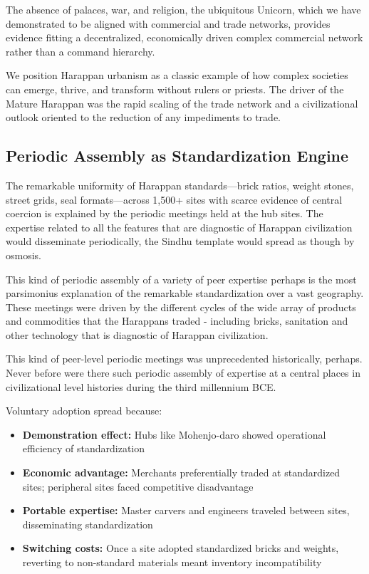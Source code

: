 \documentclass[12pt]{article}
\begin{document}
The absence of palaces, war, and religion, the ubiquitous Unicorn, which
we have demonstrated to be aligned with commercial and trade networks, provides
evidence fitting a decentralized, economically driven complex commercial network
rather than a command hierarchy.

We position Harappan urbanism as a classic example of how complex societies can emerge,
thrive, and transform without rulers or priests. The driver of the Mature Harappan
was the rapid scaling of the trade network and a civilizational outlook oriented to
the reduction of any impediments to trade.

\subsection{Periodic Assembly as Standardization Engine}

The remarkable uniformity of Harappan standards---brick ratios, weight stones, street
grids, seal formats---across 1,500+ sites with scarce evidence of central coercion is
explained by the periodic meetings held at the hub sites. The expertise related to
all the features that are diagnostic of Harappan civilization would disseminate
periodically, the Sindhu template would spread as though by osmosis.

This kind of periodic assembly of a variety of peer expertise perhaps is the most
parsimonius explanation of the remarkable standardization over a vast geography.
These meetings were driven by the different cycles of the wide array of products
and commodities that the Harappans traded - including bricks, sanitation and other
technology that is diagnostic of Harappan civilization.

This kind of peer-level periodic meetings was unprecedented historically, perhaps.
Never before were there such periodic assembly of expertise at a central places in
civilizational level histories during the third millennium BCE.

Voluntary adoption spread because:

\begin{itemize}
\item \textbf{Demonstration effect:} Hubs like Mohenjo-daro showed operational
        efficiency of standardization
\item \textbf{Economic advantage:} Merchants preferentially traded at standardized
        sites; peripheral sites faced competitive disadvantage
\item \textbf{Portable expertise:} Master carvers and engineers traveled between
        sites, disseminating standardization
\item \textbf{Switching costs:} Once a site adopted standardized bricks and weights,
        reverting to non-standard materials meant inventory incompatibility
\end{itemize}
\end{document}

